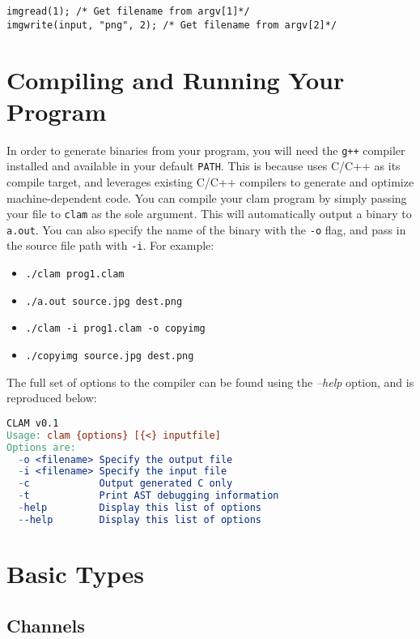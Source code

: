\begin{lstlisting}[language=CLAM,escapechar=\%]
imgread(1); /* Get filename from argv[1]*/
imgwrite(input, "png", 2); /* Get filename from argv[2]*/
\end{lstlisting}

\section{Compiling and Running Your Program}
\label{sec:compiling}

In order to generate binaries from your \sys{} program, you will need the \texttt{g++} compiler
installed and available in your default \texttt{PATH}. This is because \sys{} uses C/C++ as its
compile target, and leverages existing C/C++ compilers to generate and optimize machine-dependent code.
You can compile your clam program by simply passing your file to \texttt{clam} as the sole argument.
This will automatically output a binary to \texttt{a.out}. You can also specify the name of
the binary with the \texttt{-o} flag, and pass in the source file path with \texttt{-i}.
For example:
\begin{itemize}
  \item \texttt{./clam prog1.clam}
  \item \texttt{./a.out source.jpg dest.png}
  \item \texttt{./clam -i prog1.clam -o copyimg}
  \item \texttt{./copyimg source.jpg dest.png}
\end{itemize}

The full set of options to the \sys{} compiler can be found using the \emph{--help} option, and is
reproduced below:
\begin{lstlisting}[language=make,basicstyle=\ttfamily]
CLAM v0.1
Usage: clam {options} [{<} inputfile]
Options are:
  -o <filename> Specify the output file
  -i <filename> Specify the input file
  -c            Output generated C only
  -t            Print AST debugging information
  -help         Display this list of options
  --help        Display this list of options
\end{lstlisting}

\section{Basic Types}

\subsection{Channels}

